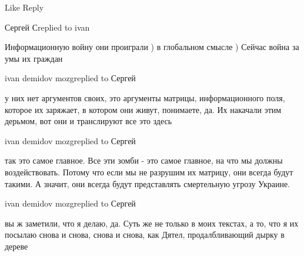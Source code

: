     Like
    Reply

Сергей Сreplied to ivan

Информационную войну они проиграли ) в глобальном смысле ) Сейчас война за умы
их граждан

ivan demidov mozgreplied to Сергей

у них нет аргументов своих, это аргументы матрицы, информационного поля,
которое их заряжает, в котором они живут, понимаете, да. Их накачали этим
дерьмом, вот они и транслируют все это здесь

ivan demidov mozgreplied to Сергей

так это самое главное. Все эти зомби - это самое главное, на что мы должны
воздействовать. Потому что если мы не разрушим их матрицу, они всегда будут
такими. А значит, они всегда будут представлять смертельную угрозу Украине.

ivan demidov mozgreplied to Сергей

вы ж заметили, что я делаю, да. Суть же не только в моих текстах, а то, что я
их посылаю снова и снова, снова и снова, как Дятел, продалбливающий дырку в
дереве
